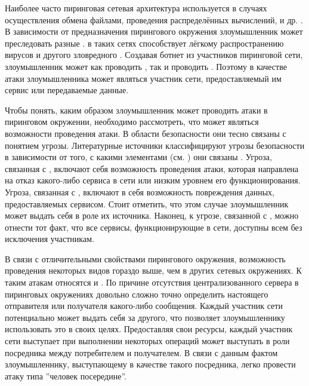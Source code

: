 %
Наиболее часто пиринговая сетевая архитектура используется в случаях осуществления обмена файлами, проведения распределённых вычислений,  и др. .
%
%
В зависимости от предназначения пирингового окружения злоумышленник может преследовать разные   . 
%
 в таких сетях способствует лёгкому распространению вирусов и другого зловредного . 
%
Создавая ботнет из участников пиринговой сети, злоумышленник может как проводить , так и проводить . 
%
Поэтому в качестве  атаки злоумышленника может являться участник сети, предоставляемый им сервис или передаваемые данные. 

%
Чтобы понять, каким образом злоумышленник может проводить атаки в пиринговом окружении, необходимо рассмотреть, что может являться  возможности проведения атаки.
%
В области безопасности они тесно связаны с понятием угрозы.
%
Литературные источники классифицируют угрозы безопасности в зависимости от того, с какими элементами  (см. ) они связаны   . 
%
Угроза, связанная с , включают себя возможность проведения атаки, которая направлена на отказ какого-либо сервиса в сети или низким уровнем его функционирования. 
%
Угроза, связанная с , включают в себя возможность повреждения данных, предоставляемых сервисом. 
%
Стоит отметить, что этом случае злоумышленник может выдать себя в роле их источника. 
%
Наконец, к угрозе, связанной с , можно отнести тот факт, что все сервисы, функционирующие в сети, доступны всем без исключения участникам.

%
В связи с отличительными свойствами пирингового окружения, возможность проведения некоторых видов  гораздо выше, чем в других сетевых окружениях. 
%
К таким атакам относятся  и  . 
%
По причине отсутствия централизованного сервера в пиринговых окружениях довольно сложно точно определить настоящего отправителя или получателя какого-либо сообщения.
%
Каждый участник сети потенциально может выдать себя за другого, что позволяет злоумышленнику использовать это в своих целях.  
%
Предоставляя свои ресурсы, каждый участник сети выступает при выполнении некоторых операций может выступать в роли посредника между потребителем и получателем.
%
В связи с данным фактом злоумышленнику, выступающему в качестве такого посредника, легко провести атаку типа ''человек посередине''. 

